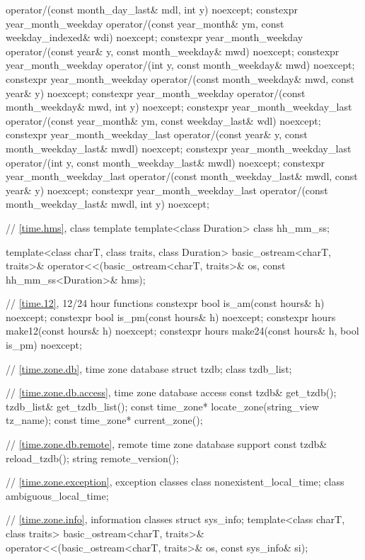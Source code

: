\begin{codeblock}
{{      operator/(const month_day_last& mdl, int y) noexcept;
    constexpr year_month_weekday
      operator/(const year_month& ym, const weekday_indexed& wdi) noexcept;
    constexpr year_month_weekday
      operator/(const year& y, const month_weekday& mwd) noexcept;
    constexpr year_month_weekday
      operator/(int y, const month_weekday& mwd) noexcept;
    constexpr year_month_weekday
      operator/(const month_weekday& mwd, const year& y) noexcept;
    constexpr year_month_weekday
      operator/(const month_weekday& mwd, int y) noexcept;
    constexpr year_month_weekday_last
      operator/(const year_month& ym, const weekday_last& wdl) noexcept;
    constexpr year_month_weekday_last
      operator/(const year& y, const month_weekday_last& mwdl) noexcept;
    constexpr year_month_weekday_last
      operator/(int y, const month_weekday_last& mwdl) noexcept;
    constexpr year_month_weekday_last
      operator/(const month_weekday_last& mwdl, const year& y) noexcept;
    constexpr year_month_weekday_last
      operator/(const month_weekday_last& mwdl, int y) noexcept;

    // \ref{time.hms}, class template 
    template<class Duration> class hh_mm_ss;

    template<class charT, class traits, class Duration>
      basic_ostream<charT, traits>&
        operator<<(basic_ostream<charT, traits>& os, const hh_mm_ss<Duration>& hms);

    // \ref{time.12}, 12/24 hour functions
    constexpr bool is_am(const hours& h) noexcept;
    constexpr bool is_pm(const hours& h) noexcept;
    constexpr hours make12(const hours& h) noexcept;
    constexpr hours make24(const hours& h, bool is_pm) noexcept;

    // \ref{time.zone.db}, time zone database
    struct tzdb;
    class tzdb_list;

    // \ref{time.zone.db.access}, time zone database access
    const tzdb& get_tzdb();
    tzdb_list& get_tzdb_list();
    const time_zone* locate_zone(string_view tz_name);
    const time_zone* current_zone();

    // \ref{time.zone.db.remote}, remote time zone database support
    const tzdb& reload_tzdb();
    string remote_version();

    // \ref{time.zone.exception}, exception classes
    class nonexistent_local_time;
    class ambiguous_local_time;

    // \ref{time.zone.info}, information classes
    struct sys_info;
    template<class charT, class traits>
      basic_ostream<charT, traits>&
        operator<<(basic_ostream<charT, traits>& os, const sys_info& si);

}}
\end{codeblock}
